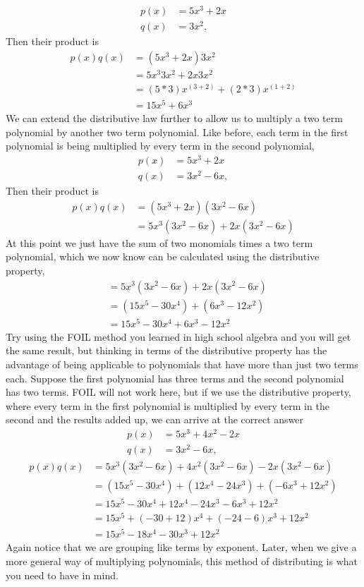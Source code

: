 \begin{align*} 
p(x) & = 5x^3 + 2x \\
q(x) & = 3x^2,
\end{align*}
Then their product is
\begin{align*}
p(x)  q(x) 
& = ( 5x^3 +2x)  3x^2 \\
&= 5x^3 3x^2 + 2x 3x^2\\
& = (5*3)x^{(3 + 2)} + (2*3)x^{(1+2)}\\ 
& = 15x^5 + 6x^3
\end{align*}
We can extend the distributive law further to allow us to multiply a two term polynomial by another two term polynomial.  Like before, each term in the first polynomial is being multiplied by every term in the second polynomial,
\begin{align*} 
p(x) & = 5x^3 + 2x \\
q(x) & = 3x^2 - 6x,
\end{align*}
Then their product is
\begin{align*}
p(x)  q(x) 
& = ( 5x^3 +2x)  (3x^2 - 6x) \\
& = 5x^3 (3x^2 - 6x) +2x(3x^2 - 6x) 
\end{align*}
At this point we just have the sum of two monomials times a two term polynomial, which we now know can be calculated using the distributive property,
\begin{align*}
& = 5x^3 (3x^2 - 6x) +2x(3x^2 - 6x) \\
& = (15x^5 -30x^4) + (6x^3-12x^2)\\
&= 15x^5 - 30x^4 + 6x^3 - 12x^2
\end{align*}
Try using the FOIL method you learned in high school algebra and you will get the same result, but thinking in terms of the distributive property has the advantage of being applicable to polynomials that have more than just two terms each.  Suppose the first polynomial has three terms and the second polynomial has two terms.  FOIL will not work here, but if we use the distributive property, where every term in the first polynomial is multiplied by every term in the second and the results added up, we can arrive at the correct answer
\begin{align*}
p(x) & = 5x^3 + 4x^2 - 2x \\
q(x) & = 3x^2 - 6x,
\end{align*}
\begin{align*}
p(x) q(x)
& = 5x^3 (3x^2 - 6x) +4x^2(3x^2 - 6x)-2x(3x^2 - 6x) \\
& = (15x^5 -30x^4) + (12x^4 - 24x^3)  + (-6x^3 + 12x^2)\\
&= 15x^5 - 30x^4 + 12x^4-24x^3 - 6x^3 + 12x^2\\
&= 15x^5 + (-30+12)x^4 + (-24-6)x^3 +12x^2 \\
&= 15x^5 - 18x^4 - 30x^3 +12x^2
\end{align*}
Again notice that we are grouping like terms by exponent.  Later, when we give a more general way of multiplying polynomials, this method of distributing is what you need to have in mind.

